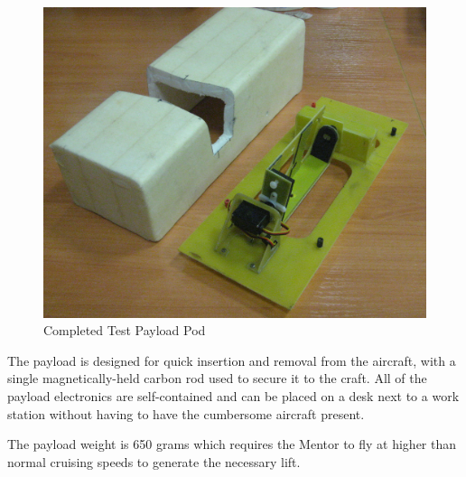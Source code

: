 \documentclass[a4paper,11pt]{report}
\begin{document}
\begin{figure}[ht]
 \centering
 \includegraphics[width=12cm]{test_payload.png}
 \caption{Completed Test Payload Pod}
 \label{fig:test_payload}
\end{figure}

The payload is designed for quick insertion and removal from the aircraft, with a single magnetically-held carbon rod used to secure it to the craft. All of the payload electronics are self-contained and can be placed on a desk next to a work station without having to have the cumbersome aircraft present.

The payload weight is 650 grams which requires the Mentor to fly at higher than normal cruising speeds to generate the necessary lift. 
\end{document}
